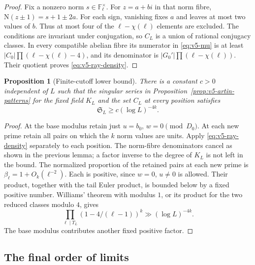 \documentclass[11pt]{article}
\newtheorem{proposition}[theorem]{Proposition}
\theoremstyle{definition}
\theoremstyle{remark}
\begin{document}
\begin{proof}
Fix a nonzero norm $s\in\mathbb F_\ell^\times$.
For $z=a+bi$ in that norm fibre,
$\mathrm N(z\pm1)=s+1\pm2a$.
For each sign, vanishing fixes $a$ and leaves at most two values of $b$.
Thus at most four of the $\ell-\chi(\ell)$ elements are excluded.
The conditions are invariant under conjugation, so $C_L$ is a union of
rational conjugacy classes.
In every compatible abelian fibre its numerator in \eqref{eq:v5-mu} is
at least $|C_0|\prod(\ell-\chi(\ell)-4)$, and its denominator is
$|G_0'|\prod(\ell-\chi(\ell))$.
Their quotient proves \eqref{eq:v5-ray-density}.
\end{proof}

\begin{proposition}[Finite-cutoff lower bound]\label{prop:v5-cutoff-lower}
There is a constant $c>0$ independent of $L$ such that the singular series
in Proposition~\ref{prop:v5-artin-patterns} for the fixed field $K_L$ and
the set $C_L$ at every position satisfies
\[
 \mathfrak S_L\geq c(\log L)^{-4k}.
\]
\end{proposition}
\begin{proof}
At the base modulus retain just $u=b_0$, $w=0\pmod{D_0}$.
At each new prime retain all pairs on which the $k$ norm values are units.
Apply \eqref{eq:v5-ray-density} separately to each position.
The norm-fibre denominators cancel as shown in the previous lemma; a
factor inverse to the degree of $K_L$ is not left in the bound.
The normalized proportion of the retained pairs at each new prime is
$\beta_\ell=1+O_k(\ell^{-2})$. Each is positive, since $w=0$, $u\ne0$
is allowed. Their product, together with the tail Euler product, is
bounded below by a fixed positive number. Williams' theorem with modulus
$1$, or its product for the two reduced classes modulo $4$, gives
\[
 \prod_{\ell\mid T_L}(1-4/(\ell-1))^k
       \gg(\log L)^{-4k}.
\]
The base modulus contributes another fixed positive factor.
\end{proof}

\subsection{The final order of limits}\label{subsec:v5-diagonal}
\end{document}
